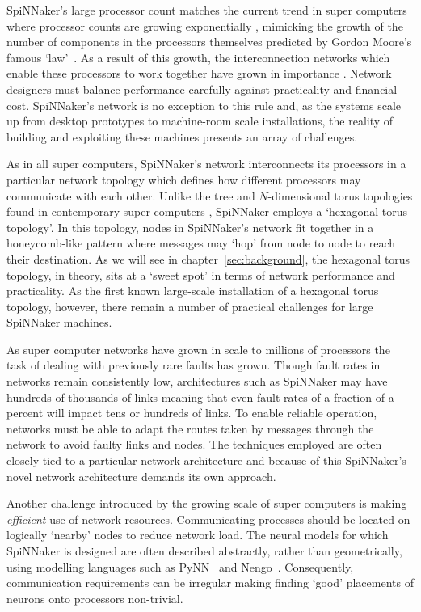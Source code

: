 SpiNNaker's large processor count matches the current trend in super computers
where processor counts are growing exponentially \cite{meuer16j}, mimicking the
growth of the number of components in the processors themselves predicted by
Gordon Moore's famous `law'~\cite{moore75}. As a result of this growth, the
interconnection networks which enable these processors to work together have
grown in importance \cite{dally01}. Network designers must balance performance
carefully against practicality and financial cost.  SpiNNaker's network is no
exception to this rule and, as the systems scale up from desktop prototypes to
machine-room scale installations, the reality of building and exploiting these
machines presents an array of challenges.

As in all super computers, SpiNNaker's network interconnects its processors in
a particular network topology which defines how different processors may
communicate with each other. Unlike the tree and $N$-dimensional torus
topologies found in contemporary super computers \cite[chapter~3]{dally04},
SpiNNaker employs a `hexagonal torus topology'. In this topology, nodes in
SpiNNaker's network fit together in a honeycomb-like pattern where messages may
`hop' from node to node to reach their destination. As we will see in
chapter~\ref{sec:background}, the hexagonal torus topology, in theory, sits at
a `sweet spot' in terms of network performance and practicality. As the first
known large-scale installation of a hexagonal torus topology, however, there
remain a number of practical challenges for large SpiNNaker machines.

As super computer networks have grown in scale to millions of processors the
task of dealing with previously rare faults has grown.  Though fault rates in
networks remain consistently low, architectures such as SpiNNaker may have
hundreds of thousands of links meaning that even fault rates of a fraction of a
percent will impact tens or hundreds of links. To enable reliable operation,
networks must be able to adapt the routes taken by messages through the network
to avoid faulty links and nodes. The techniques employed are often closely tied
to a particular network architecture and because of this SpiNNaker's novel
network architecture demands its own approach.

Another challenge introduced by the growing scale of super computers is making
\emph{efficient} use of network resources. Communicating processes should be
located on logically `nearby' nodes to reduce network load. The neural models
for which SpiNNaker is designed are often described abstractly, rather than
geometrically, using modelling languages such as PyNN~\cite{davison08} and
Nengo~\cite{eliasmith04}.  Consequently, communication requirements can be
irregular making finding `good' placements of neurons onto processors
non-trivial.

